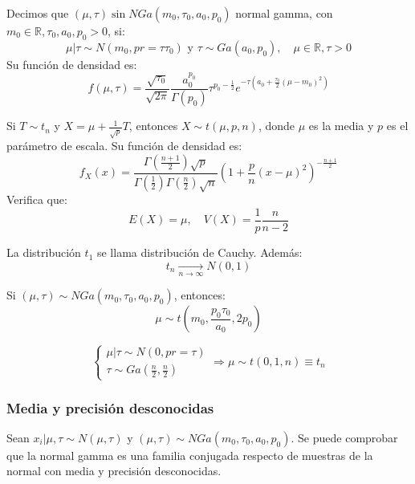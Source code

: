 \begin{definition}
    Decimos que $(\mu, \tau) \sin NGa(m_0, \tau_0, a_0, p_0)$ normal gamma, con $m_0 \in \mathbb{R}, \tau_0, a_0, p_0 > 0$, si:
    $$\mu|\tau \sim N(m_0, pr = \tau\tau_0) \text{ y } \tau \sim Ga(a_0, p_0), \quad \mu \in \mathbb{R}, \tau > 0$$
    Su función de densidad es:
    $$f(\mu, \tau) = \frac{\sqrt{\tau_0}}{\sqrt{2\pi}} \frac{a_0^{p_0}}{\Gamma(p_0)} \tau^{p_0 - \frac{1}{2}} e^{-\tau \left(a_0 + \frac{\tau_0}{2}(\mu-m_0)^2\right)}$$
\end{definition}

\begin{definition}
    Si $T \sim t_n$ y $X = \mu + \frac{1}{\sqrt{p}}T$, entonces $X \sim t(\mu, p, n)$, donde $\mu$ es la media y $p$ es el parámetro de escala.
    Su función de densidad es:
    $$f_X(x) = \frac{\Gamma\left(\frac{n+1}{2}\right)\sqrt{p}}{\Gamma\left(\frac{1}{2}\right)\Gamma\left(\frac{n}{2}\right)\sqrt{n}} \left(1 + \frac{p}{n}(x-\mu)^2\right)^{-\frac{n+1}{2}}$$
    Verifica que:
    $$E(X) = \mu, \quad V(X) = \frac{1}{p} \frac{n}{n-2}$$
\end{definition}

\begin{remark}
    La distribución $t_1$ se llama distribución de Cauchy.
    Además:
    $$t_n \xrightarrow[n \to \infty]{} N(0, 1)$$
\end{remark}

\begin{theorem}
    Si $(\mu, \tau) \sim NGa(m_0, \tau_0, a_0, p_0)$, entonces:
    $$\mu \sim t\left(m_0, \frac{p_0\tau_0}{a_0}, 2p_0\right)$$
\end{theorem}

\begin{corollary}
    $$\begin{cases}
            \mu|\tau \sim N(0, pr = \tau) \\
            \tau \sim Ga\left(\frac{n}{2}, \frac{n}{2}\right)
        \end{cases} \Rightarrow \mu \sim t(0, 1, n) \equiv t_n$$
\end{corollary}

\subsubsection*{Media y precisión desconocidas}
Sean $x_i|\mu, \tau \sim N(\mu, \tau)$ y $(\mu, \tau) \sim NGa(m_0, \tau_0, a_0, p_0)$.
Se puede comprobar que la normal gamma es una familia conjugada respecto de muestras de la normal con media y precisión desconocidas.

